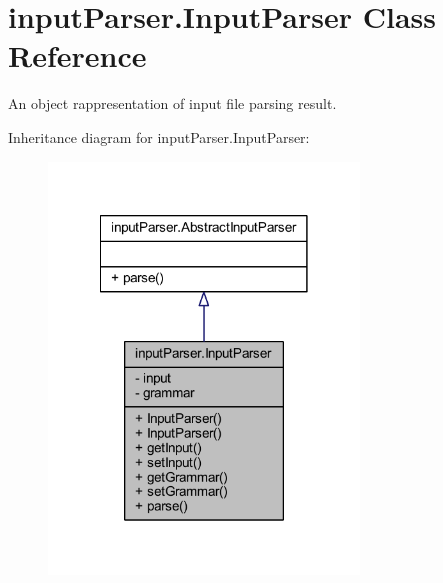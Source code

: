 \hypertarget{classinput_parser_1_1_input_parser}{\section{input\-Parser.\-Input\-Parser Class Reference}
\label{classinput_parser_1_1_input_parser}
}


An object rappresentation of input file parsing result.  




Inheritance diagram for input\-Parser.\-Input\-Parser\-:
\nopagebreak
\begin{figure}[H]
\begin{center}
\leavevmode
\includegraphics[width=234pt]{classinput_parser_1_1_input_parser__inherit__graph}
\end{center}
\end{figure}


